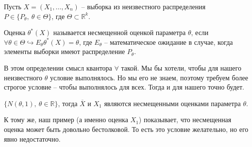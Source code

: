 Пусть $\displaystyle X=( X_{1} ,\dotsc ,X_{n})$ -- выборка из неизвестного распределения $\displaystyle P\in \{P_{\theta },\ \theta \in \Theta \}$, где $\displaystyle \Theta \subset \mathbb{R}^{k}$.
\begin{definition}
Оценка $\displaystyle \theta ^{*}( X)$ называется несмещенной оценкой параметра $\displaystyle \theta $, если $\displaystyle \forall \theta \in \Theta \hookrightarrow E_{\theta } \theta ^{*}( X) =\theta $, где $\displaystyle E_{\theta }$ -- математическое ожидание в случае, когда элементы выборки имеют распределение $\displaystyle P_{\theta }$.
\end{definition}

\begin{note}
В этом определении смысл квантора $\forall$ такой. Мы бы хотели, чтобы для нашего неизвестного $\theta$ условие выполнялось. Но мы его не знаем, поэтому требуем более строгое условие -- чтобы выполнялось для всех. Тогда и для нашего точно будет.
\end{note}

\begin{example}
$\displaystyle \{N( \theta ,1),\ \theta \in \mathbb{R}\}$, тогда $\displaystyle \overline{X}$ и $\displaystyle X_{1}$ являются несмещенными оценками параметра $\displaystyle \theta $.

К тому же, наш пример (а именно оценка $X_{1}$) показывает, что несмещенная оценка может быть довольно бестолковой. То есть это условие желательно, но его явно недостаточно.
\end{example}\\


